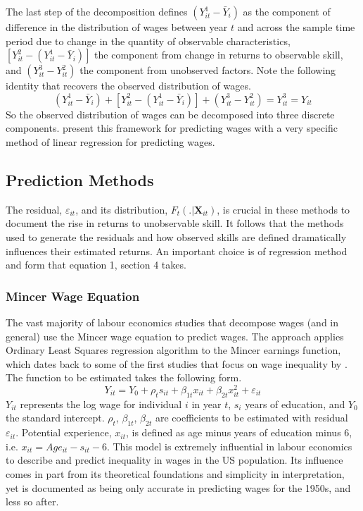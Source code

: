 \documentclass[notitlepage,12pt]{article}
\begin{document}
The last step of the decomposition defines $(Y_{it}^1-\bar{Y}_i)$ as the component of difference in the distribution of wages between year $t$ and across the sample time period due to change in the quantity of observable characteristics, $[Y_{it}^2 - (Y_{it}^1-\bar{Y}_i)]$ the component from change in returns to observable skill, and $(Y_{it}^3 - Y_{it}^2)$ the component from unobserved factors.  Note the following identity that recovers the observed distribution of wages.
\begin{equation}
(Y_{it}^1-\bar{Y}_i) + [Y_{it}^2 - (Y_{it}^1-\bar{Y}_i)] + (Y_{it}^3 - Y_{it}^2) = Y_{it}^3 = Y_{it}
\end{equation}
So the observed distribution of wages can be decomposed into three discrete components.  \cite{juhn1993wage} present this framework for predicting wages with a very specific method of linear regression for predicting wages.

\subsection{Prediction Methods}
The residual, $\varepsilon_{it}$, and its distribution, $F_t(.| \mathbf{X}_{it})$, is crucial in these methods to document the rise in returns to unobservable skill.  It follows that the methods used to generate the residuals and how observed skills are defined dramatically influences their estimated returns.  An important choice is of regression method and form that equation 1, section 4 takes.

\subsubsection{Mincer Wage Equation}
The vast majority of labour economics studies that decompose wages (and in general) use the Mincer wage equation to predict wages.  The approach applies Ordinary Least Squares regression algorithm to the Mincer earnings function, which dates back to some of the first studies that focus on wage inequality by \cite{mincer1958investment, mincer1974schooling}.  The function to be estimated takes the following form.
\begin{equation}
Y_{it}  = Y_0 + \rho_t s_{it} +\beta_{1t} x_{it} + \beta_{2t} x_{it}^2 + \varepsilon_{it}
\end{equation}
$Y_{it}$ represents the log wage for individual $i$ in year $t$, $s_i$ years of education, and $Y_0$ the standard intercept.  $\rho_t$, $\beta_{1t}$, $\beta_{2t}$ are coefficients to be estimated with residual $\varepsilon_{it}$.  Potential experience, $x_{it}$, is defined as age minus years of education minus 6, i.e. $x_{it} = Age_{it} - s_{it} - 6$.  This model is extremely influential in labour economics to describe and predict inequality in wages in the US population.  Its influence comes in part from its theoretical foundations and simplicity in interpretation, yet is documented as being only accurate in predicting wages for the 1950s, and less so after. 
\end{document}
